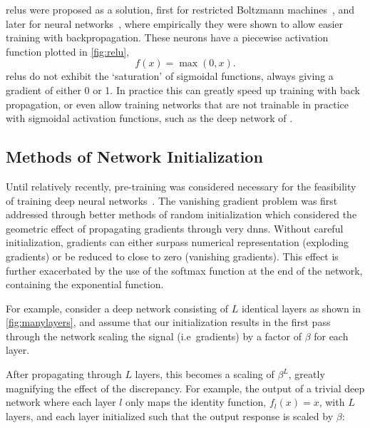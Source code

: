 \documentclass[thesis]{subfiles}
\begin{document}
\Glspl{relu} were proposed as a solution, first for restricted Boltzmann machines~\citep{conf/icml/NairH10}, and later for neural networks~\citep{glorot2010understanding}, where empirically they were shown to allow easier training with backpropagation. These neurons have a piecewise activation function plotted in \cref{fig:relu}, 
\begin{equation}
f(x) = \max(0,x).
\end{equation} 
\glspl{relu} do not exhibit the `saturation' of sigmoidal functions, always giving a gradient of either 0 or 1. In practice this can greatly speed up training with back propagation, or even allow training networks that are not trainable in practice with sigmoidal activation functions, such as the deep network of \citet{Krizhevsky2012}.

\subsection{Methods of Network Initialization}\label{ssec:init}
Until relatively recently, pre-training was considered necessary for the feasibility of training deep neural networks~\citep{hinton2006reducing}. The vanishing gradient problem was first addressed through better methods of random initialization which considered the geometric effect of propagating gradients through very \glspl{dnn}. Without careful initialization, gradients can either surpass numerical representation (exploding gradients) or be reduced to close to zero (vanishing gradients). This effect is further exacerbated by the use of the softmax function at the end of the network, containing the exponential function.

For example, consider a deep network consisting of $L$ identical layers as shown in \cref{fig:manylayers}, and assume that our initialization results in the first pass through the network scaling the signal (i.e~gradients) by a factor of $\beta$ for each layer.

After propagating through $L$ layers, this becomes a scaling of $\beta^L$, greatly magnifying the effect of the discrepancy. For example, the output of a trivial deep network  where each layer $l$ only maps the identity function, $f_{l}(x) = x$, with $L$ layers, and each layer initialized such that the output response is scaled by $\beta$:
\end{document}
